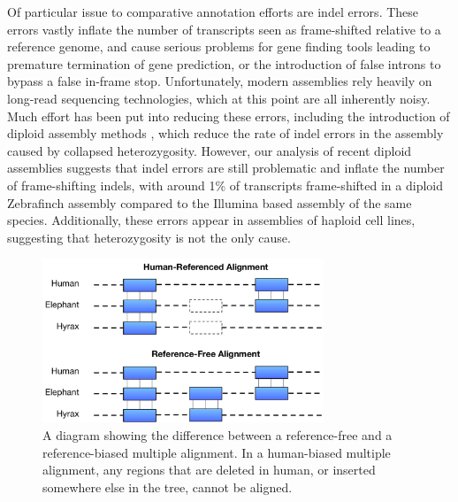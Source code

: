 \documentclass[fleqn,10pt]{wlscirep}
\begin{document}
Of particular issue to comparative annotation efforts are indel errors. These errors vastly inflate the number of transcripts seen as frame-shifted relative to a reference genome, and cause serious problems for gene finding tools leading to premature termination of gene prediction, or the introduction of false introns to bypass a false in-frame stop. Unfortunately, modern assemblies rely heavily on long-read sequencing technologies, which at this point are all inherently noisy. Much effort has been put into reducing these errors, including the introduction of diploid assembly methods \cite{chin2016phased}, which reduce the rate of indel errors in the assembly caused by collapsed heterozygosity. However, our analysis of recent diploid assemblies suggests that indel errors are still problematic and inflate the number of frame-shifting indels, with around 1\% of transcripts frame-shifted in a diploid Zebrafinch assembly
compared to the Illumina based assembly of the same species. Additionally, these errors appear in assemblies of haploid cell lines, suggesting that heterozygosity is not the only cause.

\begin{figure}
\begin{center}
\includegraphics[width=0.75\textwidth]{reference-free-diagram}
\caption{A diagram showing the difference between a reference-free and a reference-biased multiple alignment. In a human-biased multiple alignment, any regions that are deleted in human, or inserted somewhere else in the tree, cannot be aligned.}\label{fig:referencefree}
\end{center}
\end{figure}
\end{document}
